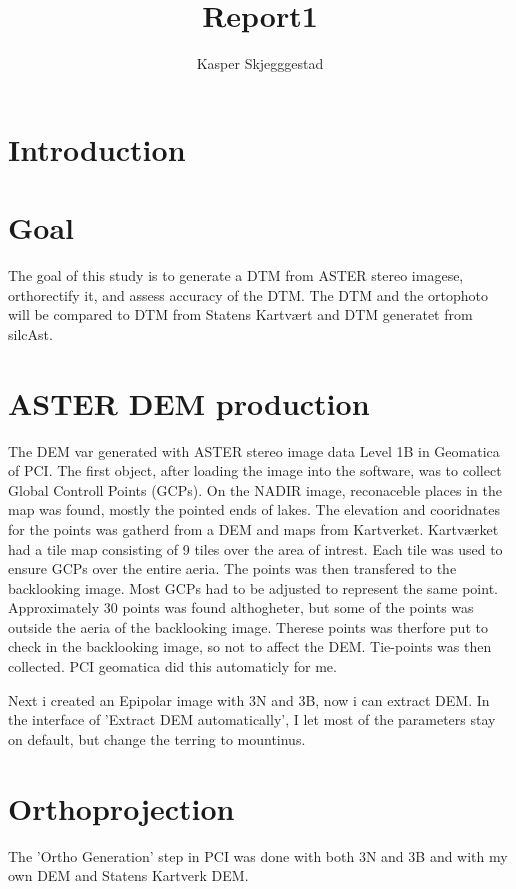 \documentclass[a4paper,UKenglish]{article}
\title{Report1}
\author{Kasper Skjegggestad}
\begin{document}
\maketitle
\tableofcontents

\section{Introduction}

\section{Goal}

The goal of this study is to generate a DTM from ASTER stereo imagese, orthorectify it, and assess accuracy of the DTM. The DTM and the ortophoto will be compared to DTM from Statens Kartvært and DTM generatet from silcAst. 

\section{ASTER DEM production}

The DEM var generated with ASTER stereo image data Level 1B in Geomatica of PCI. The first object, after loading the image into the software, was to collect Global Controll Points (GCPs). On the NADIR image, reconaceble places in the map was found, mostly the pointed ends of lakes. The elevation and cooridnates for the points was gatherd from a DEM and maps from Kartverket. Kartværket had a tile map consisting of 9 tiles over the area of intrest. Each tile was used to ensure GCPs over the entire aeria. The points was then transfered to the backlooking image. Most GCPs had to be adjusted to represent the same point. Approximately 30 points was found althogheter, but some of the points was outside the aeria of the backlooking image. Therese points was therfore put to check in the backlooking image, so not to affect the DEM. Tie-points was then collected. PCI geomatica did this automaticly for me.

Next i created an Epipolar image with 3N and 3B, now i can extract DEM. In the interface of 'Extract DEM automatically', I let most of the parameters stay on default, but change the terring to mountinus.

\section{Orthoprojection}

The 'Ortho Generation' step in PCI was done with both 3N and 3B and with my own DEM and Statens Kartverk DEM.
\end{document}
